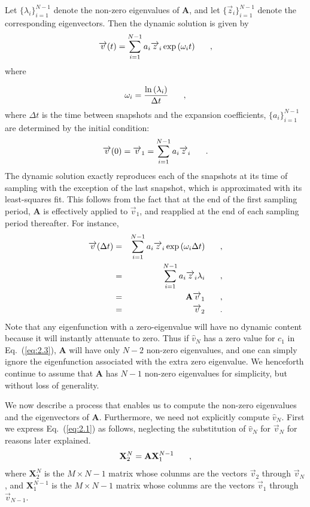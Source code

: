 \documentclass{style/nseJournal}
\renewcommand{\vec}[1]{\overrightarrow{#1}}
\newcommand{\bea}{\begin{eqnarray}}
\newcommand{\eea}{\end{eqnarray}}
\newcommand{\be}{\begin{equation}}
\newcommand{\ee}{\end{equation}}
\newcommand{\pec}{\hspace{0.25in},}
\newcommand{\pep}{\hspace{0.25in}.}
\newcommand{\LEQ}[1]{\label{eq:#1}}
\newcommand{\EQ}[1]{Eq.~(\ref{eq:#1})}
\newcommand{\mA}{\mathbf{A}}
\newcommand{\mX}{\mathbf{X}}
\begin{document}
Let $\{\lambda_i\}_{i=1}^{N-1}$ denote the non-zero eigenvalues of $\mA$, and let $\{\vec{z}_i\}_{i=1}^{N-1}$ denote the corresponding eigenvectors.  
Then the dynamic solution is given by 
\be
	\vec{v}(t) = \sum_{i=1}^{N-1} a_i \vec{z}_i \exp{(\omega_i t)} \pec
\LEQ{2.5a}
\ee
where

\be
	\omega_i = \frac{\ln{(\lambda_i)}}{\Delta t} \pec
	\LEQ{2.5b}
\ee
where $\Delta t$ is the time between snapshots and the expansion coefficients, 
$\{a_i\}_{i=1}^{N-1}$ are determined by the initial condition:
\be
	\vec{v}(0) = \vec{v}_1 = \sum_{i=1}^{N-1} a_i \vec{z}_i \pep
	\LEQ{2.5c}
\ee
The dynamic solution exactly reproduces each of the snapshots at its time of 
sampling with the exception of the last snapshot, which is approximated with 
its least-squares fit.  
This follows from the fact that at the end of the first sampling period, $\mA$ 
is effectively applied to $\vec{v}_1$, and reapplied at the end of each 
sampling period thereafter.  
For instance, 
\bea
	\vec{v}(\Delta t) &=& \sum_{i=1}^{N-1} a_i \vec{z}_i \exp{(\omega_i \Delta t)} \pec \nonumber \\
	&=& \sum_{i=1}^{N-1} a_i \vec{z}_i \lambda_i \pec \nonumber \\ 
	&=& \mA \vec{v}_1 \pec \nonumber \\ 
	&=& \vec{v}_2 \pep
	\LEQ{2.5d}
\eea 
Note that any eigenfunction with a zero-eigenvalue will have no dynamic content because it will instantly attenuate to zero.  
Thus if $\widehat{v}_N$ has a zero value for $c_1$ in \EQ{2.3}, $\mA$ will have only $N-2$ non-zero eigenvalues, and one can simply ignore the eigenfunction associated with the extra zero eigenvalue.  
We henceforth continue to assume that $\mA$ has $N-1$ non-zero eigenvalues for simplicity, but without loss of generality.  

We now describe a process that enables us to compute the non-zero eigenvalues and the eigenvectors of $\mA$.  
Furthermore, we need not explicitly compute $\widehat{v}_N$.  
First we express \EQ{2.1} as follows, neglecting the substitution of $\widehat{v}_N$ for $\vec{v}_N$ for reasons later explained.  
\be
	\mX_2^{N} = \mA \mX_{1}^{N-1} \pec
\LEQ{2.6}
\ee
where $\mX_2^{N}$ is the $M \times N-1$ matrix whose colunms are the vectors $\vec{v}_2$ through $\vec{v}_{N}$, and $\mX_{1}^{N-1}$ is the $M\times N-1$ matrix whose colunms are the vectors $\vec{v}_1$ through $\vec{v}_{N-1}$.  
\end{document}
